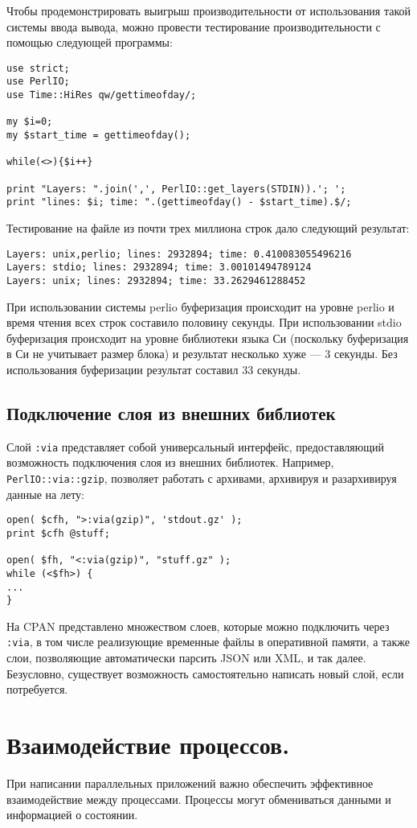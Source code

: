 Чтобы продемонстрировать выигрыш производительности от использования такой системы ввода вывода, можно провести тестирование производительности с помощью следующей программы:
\begin{verbatim}
use strict;
use PerlIO;
use Time::HiRes qw/gettimeofday/;

my $i=0;
my $start_time = gettimeofday();

while(<>){$i++}

print "Layers: ".join(',', PerlIO::get_layers(STDIN)).'; ';
print "lines: $i; time: ".(gettimeofday() - $start_time).$/;
\end{verbatim}
Тестирование на файле из почти трех миллиона строк дало следующий результат:
\begin{verbatim}
Layers: unix,perlio; lines: 2932894; time: 0.410083055496216
Layers: stdio; lines: 2932894; time: 3.00101494789124
Layers: unix; lines: 2932894; time: 33.2629461288452
\end{verbatim}
При использовании системы perlio буферизация происходит на уровне perlio и время чтения всех строк составило половину секунды. При использовании stdio буферизация происходит на уровне библиотеки языка Си (поскольку буферизация в Си не учитывает размер блока) и результат несколько хуже --- 3 секунды. Без использования буферизации результат составил 33 секунды.

\subsection{Подключение слоя из внешних библиотек}
Слой \verb|:via| представляет собой универсальный интерфейс, предоставляющий возможность подключения слоя из внешних библиотек. Например, \verb|PerlIO::via::gzip|, позволяет работать с архивами, архивируя и разархивируя данные на лету:
\begin{verbatim}
open( $cfh, ">:via(gzip)", 'stdout.gz' );
print $cfh @stuff;

open( $fh, "<:via(gzip)", "stuff.gz" );
while (<$fh>) {
...
}
\end{verbatim}
На CPAN представлено множеством слоев, которые можно подключить через \verb|:via|, в том числе реализующие временные файлы в оперативной памяти, а также слои, позволяющие автоматически парсить JSON или XML, и так далее. Безусловно, существует возможность самостоятельно написать новый слой, если потребуется.

\section{Взаимодействие процессов.} %
При написании параллельных приложений важно обеспечить эффективное взаимодействие между процессами. Процессы могут обмениваться данными и информацией о состоянии.

